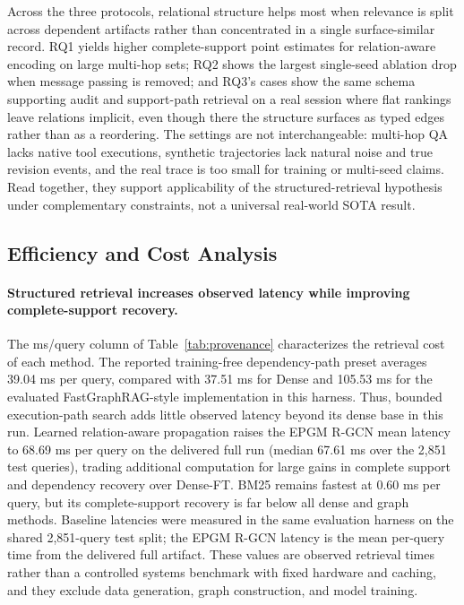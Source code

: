 Across the three protocols, relational structure helps most when
relevance is split across dependent artifacts rather than concentrated in
a single surface-similar record. RQ1 yields higher complete-support point
estimates for relation-aware encoding on large multi-hop sets; RQ2 shows
the largest single-seed ablation drop when message passing is removed; and
RQ3's cases show the same schema supporting audit and support-path retrieval
on a real session where flat rankings leave relations implicit, even though
there the structure surfaces as typed edges rather than as a reordering.
The settings
are not interchangeable: multi-hop QA lacks native tool executions,
synthetic trajectories lack natural noise and true revision events, and
the real trace is too small for training or multi-seed claims. Read
together, they support applicability of the structured-retrieval
hypothesis under complementary constraints, not a universal real-world
SOTA result.

\subsection{Efficiency and Cost Analysis}

\paragraph{Structured retrieval increases observed latency while improving
complete-support recovery.}
The ms/query column of Table~\ref{tab:provenance} characterizes the
retrieval cost of each method. The reported training-free dependency-path preset averages 39.04 ms per
query, compared with 37.51 ms for Dense and 105.53 ms for the evaluated
FastGraphRAG-style implementation in this harness. Thus, bounded
execution-path search adds little observed latency beyond its dense base in
this run. Learned relation-aware propagation raises the EPGM R-GCN mean
latency to 68.69 ms per query on the delivered full run (median
67.61 ms over the 2,851 test queries), trading additional computation for
large gains in complete support and dependency recovery over Dense-FT. BM25
remains fastest at 0.60 ms per query, but its complete-support recovery is
far below all dense and graph methods. Baseline latencies were measured in
the same evaluation harness on the shared 2,851-query test split; the EPGM
R-GCN latency is the mean per-query time from the delivered full artifact.
These values are observed retrieval times rather than a controlled systems
benchmark with fixed hardware and caching, and they exclude data
generation, graph construction, and model training.

